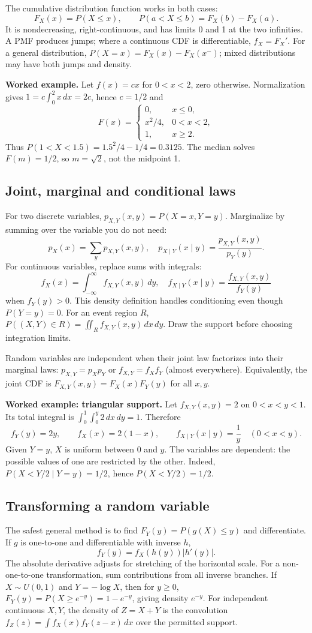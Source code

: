 The cumulative distribution function works in both cases:
\[
F_X(x)=P(X\leq x),\qquad P(a<X\leq b)=F_X(b)-F_X(a).
\]
It is nondecreasing, right-continuous, and has limits 0 and 1 at the two
infinities. A PMF produces jumps; where a continuous CDF is differentiable,
$f_X=F_X'$. For a general distribution,
$P(X=x)=F_X(x)-F_X(x^-)$; mixed distributions may have both jumps and density.

\textbf{Worked example.} Let $f(x)=cx$ for $0<x<2$, zero otherwise.
Normalization gives $1=c\int_0^2x\,dx=2c$, hence $c=1/2$ and
\[
F(x)=\begin{cases}0,&x\leq0,\\x^2/4,&0<x<2,\\1,&x\geq2.\end{cases}
\]
Thus $P(1<X<1.5)=1.5^2/4-1/4=0.3125$. The median solves
$F(m)=1/2$, so $m=\sqrt2$, not the midpoint 1.

\subsection{Joint, marginal and conditional laws}
For two discrete variables, $p_{X,Y}(x,y)=P(X=x,Y=y)$. Marginalize by
summing over the variable you do not need:
\[
p_X(x)=\sum_y p_{X,Y}(x,y),\quad
p_{X\mid Y}(x\mid y)=\frac{p_{X,Y}(x,y)}{p_Y(y)}.
\]
For continuous variables, replace sums with integrals:
\[
f_X(x)=\int_{-\infty}^{\infty} f_{X,Y}(x,y)\,dy,\quad
f_{X\mid Y}(x\mid y)=\frac{f_{X,Y}(x,y)}{f_Y(y)}
\]
when $f_Y(y)>0$. This density definition handles conditioning even though
$P(Y=y)=0$. For an event region $R$,
$P((X,Y)\in R)=\iint_R f_{X,Y}(x,y)\,dx\,dy$.
Draw the support before choosing integration limits.

Random variables are independent when their joint law factorizes into
their marginal laws: $p_{X,Y}=p_Xp_Y$ or $f_{X,Y}=f_Xf_Y$ (almost everywhere).
Equivalently, the joint CDF is $F_{X,Y}(x,y)=F_X(x)F_Y(y)$ for all $x,y$.

\textbf{Worked example: triangular support.} Let $f_{X,Y}(x,y)=2$ on
$0<x<y<1$. Its total integral is
$\int_0^1\int_0^y2\,dx\,dy=1$. Therefore
\[
f_Y(y)=2y,\qquad f_X(x)=2(1-x),\qquad
f_{X\mid Y}(x\mid y)=\frac1y\quad(0<x<y).
\]
Given $Y=y$, $X$ is uniform between 0 and $y$. The variables are dependent:
the possible values of one are restricted by the other. Indeed,
$P(X<Y/2\mid Y=y)=1/2$, hence $P(X<Y/2)=1/2$.

\subsection{Transforming a random variable}
The safest general method is to find $F_Y(y)=P(g(X)\leq y)$ and differentiate.
If $g$ is one-to-one and differentiable with inverse $h$,
\[
f_Y(y)=f_X(h(y))|h'(y)|.
\]
The absolute derivative adjusts for stretching of the horizontal scale.
For a non-one-to-one transformation, sum contributions from all inverse
branches. If $X\sim U(0,1)$ and $Y=-\log X$, then for $y\geq0$,
$F_Y(y)=P(X\geq e^{-y})=1-e^{-y}$, giving density $e^{-y}$.
For independent continuous $X,Y$, the density of $Z=X+Y$ is the convolution
$f_Z(z)=\int f_X(x)f_Y(z-x)\,dx$ over the permitted support.

